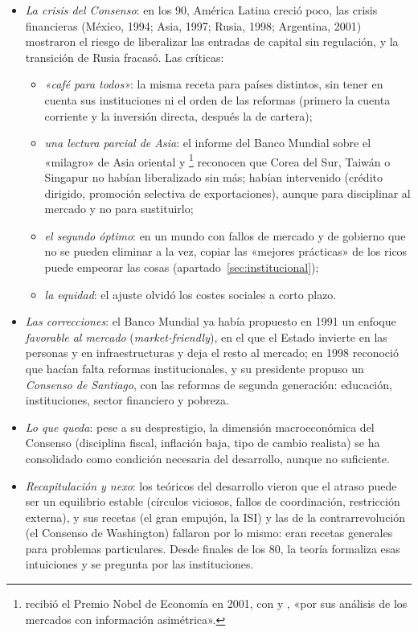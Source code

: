 \documentclass[11pt]{article}
\begin{document}
\begin{itemize}
\item \emph{La crisis del Consenso}: en los 90, América Latina creció poco, las crisis financieras (México, 1994; Asia, 1997; Rusia, 1998; Argentina, 2001) mostraron el riesgo de liberalizar las entradas de capital sin regulación, y la transición de Rusia fracasó. Las críticas:
  \begin{itemize}
  \item \emph{«café para todos»}: la misma receta para países distintos, sin tener en cuenta sus instituciones ni el orden de las reformas (primero la cuenta corriente y la inversión directa, después la de cartera);
  \item \emph{una lectura parcial de Asia}: el informe del Banco Mundial sobre el «milagro» de Asia oriental\nocite{BM1993Milagro} y \textcite{Stiglitz1996}\footnote{ recibió el Premio Nobel de Economía en 2001, con  y , «por sus análisis de los mercados con información asimétrica»\nocite{Nobel2001AkerlofSpenceStiglitz}.} reconocen que Corea del Sur, Taiwán o Singapur no habían liberalizado sin más; habían intervenido (crédito dirigido, promoción selectiva de exportaciones), aunque para disciplinar al mercado y no para sustituirlo;
  \item \emph{el segundo óptimo}: en un mundo con fallos de mercado y de gobierno que no se pueden eliminar a la vez, copiar las «mejores prácticas» de los ricos puede empeorar las cosas  (apartado~\ref{sec:institucional});
  \item \emph{la equidad}: el ajuste olvidó los costes sociales a corto plazo.
  \end{itemize}
\item \emph{Las correcciones}: el Banco Mundial ya había propuesto en 1991 un enfoque \emph{favorable al mercado} (\emph{market-friendly}), en el que el Estado invierte en las personas y en infraestructuras y deja el resto al mercado\nocite{BM1991Informe}; en 1998 reconoció que hacían falta reformas institucionales\nocite{BurkiPerry1998}, y su presidente propuso un \emph{Consenso de Santiago}, con las reformas de segunda generación: educación, instituciones, sector financiero y pobreza\nocite{Wolfensohn1998}.
\item \emph{Lo que queda}: pese a su desprestigio, la dimensión macroeconómica del Consenso (disciplina fiscal, inflación baja, tipo de cambio realista) se ha consolidado como condición necesaria del desarrollo, aunque no suficiente.
\item \emph{Recapitulación y nexo}: los teóricos del desarrollo vieron que el atraso puede ser un equilibrio estable (círculos viciosos, fallos de coordinación, restricción externa), y sus recetas (el gran empujón, la ISI) y las de la contrarrevolución (el Consenso de Washington) fallaron por lo mismo: eran recetas generales para problemas particulares. Desde finales de los 80, la teoría formaliza esas intuiciones y se pregunta por las instituciones.
\end{itemize}
\end{document}
